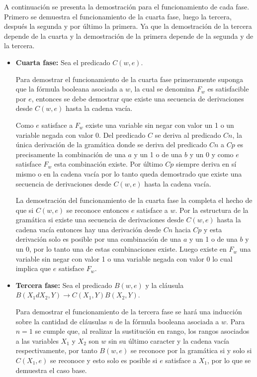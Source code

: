 A continuación se presenta la demostración para el funcionamiento de cada fase. Primero se demuestra
el funcionamiento de la cuarta fase, luego la tercera, después la segunda y por último la primera.
Ya que la demostración de la tercera depende de la cuarta y la demostración de la primera depende de la
segunda y de la tercera.

\begin{itemize}
    \item \textbf{Cuarta fase:} Sea el predicado $C(w,e)$.

          Para demostrar el funcionamiento de la cuarta fase primeramente suponga que la fórmula booleana
          asociada a $w$, la cual se denomina $F_w$ es satisfacible por $e$, entonces se debe demostrar
          que existe una secuencia de derivaciones desde $C(w,e)$ hasta la cadena vacía.

          Como $e$ satisface a $F_w$ existe una variable sin negar con valor un 1 o un variable negada con valor 0.
          Del predicado $C$ se deriva al predicado $Cn$, la única derivación de la gramática donde se deriva del predicado $Cn$ a $Cp$ es precisamente
          la combinación de una $a$ y un 1 o de una $b$ y un 0 y como $e$ satisface $F_w$ esta combinación existe.
          Por último $Cp$ siempre deriva en sí mismo o en la cadena vacía por lo tanto queda demostrado que existe
          una secuencia de derivaciones desde $C(w,e)$ hasta la cadena vacía.

          La demostración del funcionamiento de la cuarta fase la completa el hecho de que si $C(w,e)$ se reconoce
          entonces $e$ satisface a $w$. Por la estructura de la gramática si existe una secuencia de derivaciones
          desde $C(w,e)$ hasta la cadena vacía entonces hay una derivación desde $Cn$ hacia $Cp$ y esta derivación
          solo es posible por una combinación de una $a$ y un 1 o de una $b$ y un 0, por lo tanto una de estas
          combinaciones existe. Luego existe en $F_w$ una variable sin negar con valor 1 o una variable negada
          con valor 0 lo cual implica que $e$ satisface $F_w$.

    \item \textbf{Tercera fase:} Sea el predicado $B(w,e)$ y la cláusula $B(X_1dX_2,Y)\to C(X_1,Y) B(X_2,Y)$.

          Para demostrar el funcionamiento de la tercera fase se hará una inducción sobre la cantidad de
          cláusulas $n$ de la fórmula booleana asociada a $w$. Para $n=1$ se cumple que, al realizar la sustitución
          en rango, los rangos asociados a las variables $X_1$ y $X_2$ son $w$ sin su último caracter y la cadena
          vacía respectivamente, por tanto $B(w,e)$ se reconoce por la gramática si y solo si $C(X_1,e)$ se reconoce
          y esto solo es posible si $e$ satisface a $X_1$, por lo que se demuestra el caso base.


\end{itemize}
